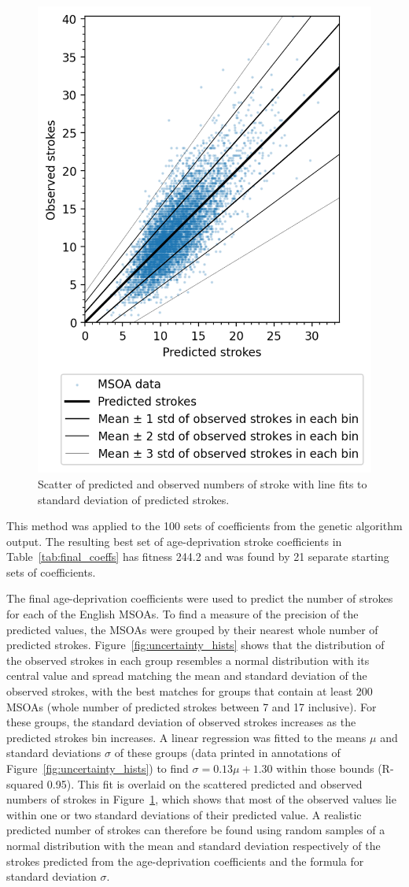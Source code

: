 \documentclass[12pt]{extarticle}
\begin{document}
\begin{figure}
    \centering
    \includegraphics[width=0.5\linewidth]{images/uncertainty_fitted_std.png}
    \caption{Scatter of predicted and observed numbers of stroke with line fits to standard deviation of predicted strokes.}
    \label{fig:uncertainty_fitted_std}
\end{figure}


This method was applied to the 100 sets of coefficients from the genetic algorithm output. 
The resulting best set of age-deprivation stroke coefficients in Table~\ref{tab:final_coeffs} has fitness 244.2 and was found by 21 separate starting sets of coefficients.

The final age-deprivation coefficients were used to predict the number of strokes for each of the English MSOAs.
% 
To find a measure of the precision of the predicted values, the MSOAs were grouped by their nearest whole number of predicted strokes. Figure~\ref{fig:uncertainty_hists} shows that the distribution of the observed strokes in each group resembles a normal distribution with its central value and spread matching the mean and standard deviation of the observed strokes, with the best matches for groups that contain at least 200 MSOAs (whole number of predicted strokes between 7 and 17 inclusive).
% 
For these groups, the standard deviation of observed strokes increases as the predicted strokes bin increases.
%
A linear regression was fitted to the means $\mu$ and standard deviations $\sigma$ of these groups (data printed in annotations of Figure~\ref{fig:uncertainty_hists}) to find $\sigma = 0.13\mu + 1.30$ within those bounds (R-squared 0.95).
This fit is overlaid on the scattered predicted and observed numbers of strokes in Figure~\ref{fig:uncertainty_fitted_std}, which shows that most of the observed values lie within one or two standard deviations of their predicted value.
% 
A realistic predicted number of strokes can therefore be found using random samples of a normal distribution with the mean and standard deviation respectively of the strokes predicted from the age-deprivation coefficients and the formula for standard deviation $\sigma$.
\end{document}
